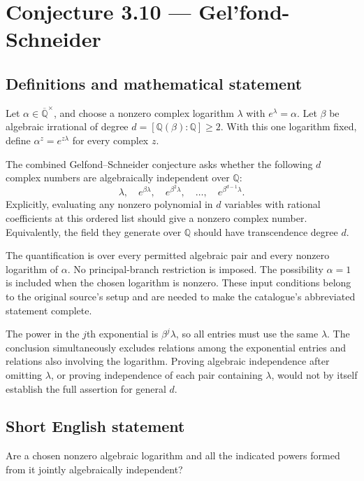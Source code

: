 \documentclass[11pt,a4paper]{article}
\begin{document}
\section*{Conjecture 3.10 — Gel’fond-Schneider}\label{statement}

\subsection{Definitions and mathematical statement}
Let $\alpha\in\overline{\mathbb Q}^{\times}$, and choose a nonzero complex logarithm $\lambda$ with $e^\lambda=\alpha$. Let $\beta$ be algebraic irrational of degree $d=[\mathbb Q(\beta):\mathbb Q]\ge2$. With this one logarithm fixed, define $\alpha^z=e^{z\lambda}$ for every complex $z$.

The combined Gelfond--Schneider conjecture asks whether the following $d$ complex numbers are algebraically independent over $\mathbb Q$:
\[
\lambda,\quad e^{\beta\lambda},\quad e^{\beta^2\lambda},
\quad\ldots,\quad e^{\beta^{d-1}\lambda}.
\]
Explicitly, evaluating any nonzero polynomial in $d$ variables with rational coefficients at this ordered list should give a nonzero complex number. Equivalently, the field they generate over $\mathbb Q$ should have transcendence degree $d$.

The quantification is over every permitted algebraic pair and every nonzero logarithm of $\alpha$. No principal-branch restriction is imposed. The possibility $\alpha=1$ is included when the chosen logarithm is nonzero. These input conditions belong to the original source's setup and are needed to make the catalogue's abbreviated statement complete.

The power in the $j$th exponential is $\beta^j\lambda$, so all entries must use the same $\lambda$. The conclusion simultaneously excludes relations among the exponential entries and relations also involving the logarithm. Proving algebraic independence after omitting $\lambda$, or proving independence of each pair containing $\lambda$, would not by itself establish the full assertion for general $d$.
\subsection{Short English statement}
Are a chosen nonzero algebraic logarithm and all the indicated powers formed from it jointly algebraically independent?
\end{document}
